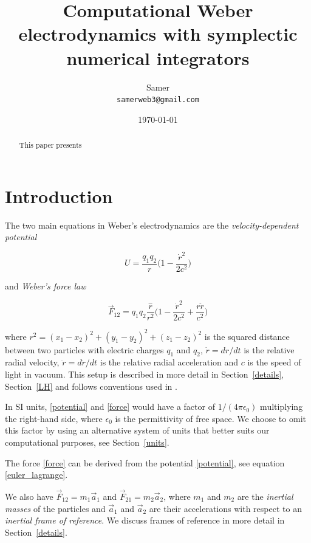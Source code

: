 \documentclass[12pt,a4paper]{article}
\title{Computational Weber electrodynamics with symplectic numerical integrators}
\author{Samer\\ \small \texttt{samerweb3@gmail.com}}
\date{\today}
\theoremstyle{definition}
\theoremstyle{remark}
\newcommand{\qq}{q_1 q_2}
\newcommand{\rdot}{\dot{r}}
\begin{document}
\maketitle

\begin{abstract}
    This paper presents
\end{abstract}

\section{Introduction}

The two main equations in Weber's electrodynamics are the \textit{velocity-dependent potential}

\begin{equation}\label{potential}
    U = \frac{\qq}{r}\bigg(1 - \frac{\rdot^2}{2c^2}\bigg)
\end{equation}

and \textit{Weber's force law}

\begin{equation}\label{force}
    \vec{F}_{12} = \qq \frac{\hat{r}}{r^2}\bigg(1 - \frac{\rdot^2}{2c^2} + \frac{r\ddot{r}}{c^2}\bigg)
\end{equation}

where $r^2 = (x_1 - x_2)^2 + (y_1 - y_2)^2 + (z_1 - z_2)^2$ is the squared distance between two particles with electric charges $q_1$ and $q_2$, $\rdot = dr/dt$ is the relative radial velocity, $\ddot{r} = d\rdot/dt$ is the relative radial acceleration and $c$ is the speed of light in vacuum. This setup is described in more detail in Section~\ref{details}, Section~\ref{LH} and follows conventions used in \citet{assis-weber}.

In SI units, \eqref{potential} and \eqref{force} would have a factor of $1/(4\pi \epsilon_0)$ multiplying the right-hand side, where $\epsilon_0$ is the permittivity of free space. We choose to omit this factor by using an alternative system of units that better suits our computational purposes, see Section~\ref{units}.

The force \eqref{force} can be derived from the potential \eqref{potential}, see equation \eqref{euler_lagrange}.

We also have $\vec{F}_{12} = m_1\vec{a}_1$ and $\vec{F}_{21} = m_2\vec{a}_2$, where $m_1$ and $m_2$ are the \textit{inertial masses} of the particles and $\vec{a}_1$ and $\vec{a}_2$ are their accelerations with respect to an \textit{inertial frame of reference}. We discuss frames of reference in more detail in Section~\ref{details}.
\end{document}
